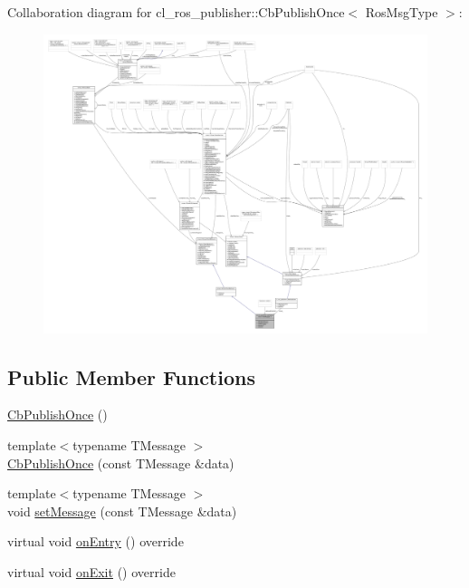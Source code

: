 Collaboration diagram for cl\+\_\+ros\+\_\+publisher\+:\+:Cb\+Publish\+Once$<$ Ros\+Msg\+Type $>$\+:
\nopagebreak
\begin{figure}[H]
\begin{center}
\leavevmode
\includegraphics[width=350pt]{classcl__ros__publisher_1_1CbPublishOnce__coll__graph}
\end{center}
\end{figure}
\subsection*{Public Member Functions}
\begin{DoxyCompactItemize}
\item 
\hyperlink{classcl__ros__publisher_1_1CbPublishOnce_a9706b20ed8ed9af79396a446abf44344}{Cb\+Publish\+Once} ()
\item 
{\footnotesize template$<$typename T\+Message $>$ }\\\hyperlink{classcl__ros__publisher_1_1CbPublishOnce_a54d9062c233e9949ec45c27da69cf83d}{Cb\+Publish\+Once} (const T\+Message \&data)
\item 
{\footnotesize template$<$typename T\+Message $>$ }\\void \hyperlink{classcl__ros__publisher_1_1CbPublishOnce_aedf3cb7940951d76773f46c807f34a58}{set\+Message} (const T\+Message \&data)
\item 
virtual void \hyperlink{classcl__ros__publisher_1_1CbPublishOnce_afaed71bc2694ec1837278d5f931a76e1}{on\+Entry} () override
\item 
virtual void \hyperlink{classcl__ros__publisher_1_1CbPublishOnce_ad82cb7d6ac69fe9b91bc955550ab92cb}{on\+Exit} () override
\end{DoxyCompactItemize}
